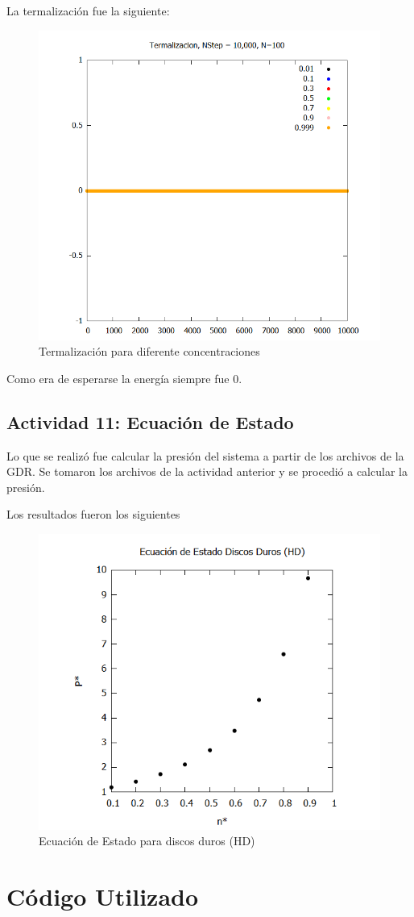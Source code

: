 \documentclass[12pt,letterpaper]{article}
\begin{document}
La termalización fue la siguiente:
\begin{figure}[H]
	\centering
	\includegraphics[width=0.50\linewidth]{TermaT.png}
	\caption{Termalización para diferente concentraciones}
	\label{Term_Cons}
\end{figure}
Como era de esperarse la energía siempre fue 0.


\subsection*{Actividad 11: Ecuación de Estado}

Lo que se realizó fue calcular la presión del sistema a partir de los archivos de la GDR. Se tomaron los archivos de la actividad anterior y se procedió a calcular la presión.

Los resultados fueron los siguientes
\begin{figure}[H]
	\centering
	\includegraphics[width = 0.5\linewidth]{EcEstado.png}
	\caption{Ecuación de Estado para discos duros (HD)}
\end{figure}


\section*{Código Utilizado}

\end{document}

